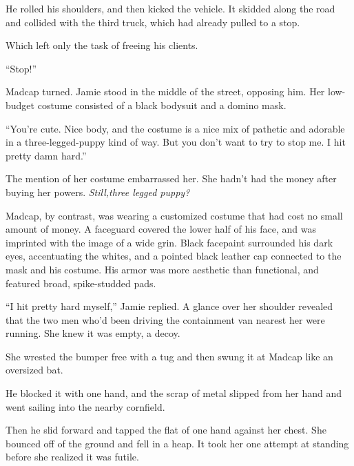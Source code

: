 He rolled his shoulders, and then kicked the vehicle.  It skidded along the road and collided with the third truck, which had already pulled to a stop.



Which left only the task of freeing his clients.



``Stop!''



Madcap turned.  Jamie stood in the middle of the street, opposing him.  Her low-budget costume consisted of a black bodysuit and a domino mask.



``You're cute.  Nice body, and the costume is a nice mix of pathetic and adorable in a three-legged-puppy kind of way.   But you don't want to try to stop me.  I hit pretty damn hard.''



The mention of her costume embarrassed her.  She hadn't had the money after buying her powers.  \emph{Still,}\emph{three legged puppy?}



Madcap, by contrast, was wearing a customized costume that had cost no small amount of money.  A faceguard covered the lower half of his face, and was imprinted with the image of a wide grin.  Black facepaint surrounded his dark eyes, accentuating the whites, and a pointed black leather cap connected to the mask and his costume.  His armor was more aesthetic than functional, and featured broad, spike-studded pads.



``I hit pretty hard myself,'' Jamie replied.  A glance over her shoulder revealed that the two men who'd been driving the containment van nearest her were running.  She knew it was empty, a decoy.



She wrested the bumper free with a tug and then swung it at Madcap like an oversized bat.



He blocked it with one hand, and the scrap of metal slipped from her hand and went sailing into the nearby cornfield.



Then he slid forward and tapped the flat of one hand against her chest.  She bounced off of the ground and fell in a heap.  It took her one attempt at standing before she realized it was futile.



